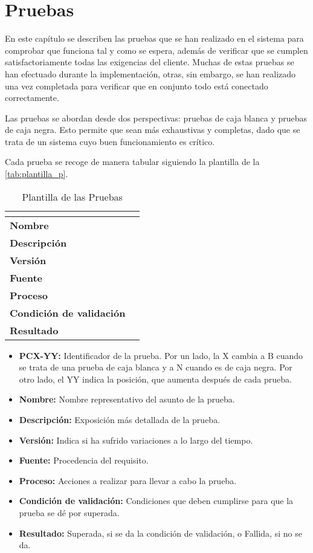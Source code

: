 \chapter{Pruebas}
\label{ch:pruebas}
En este capítulo se describen las pruebas que se han realizado en el sistema para comprobar que funciona tal y como se espera, además de verificar que se cumplen satisfactoriamente todas las exigencias del cliente. Muchas de estas pruebas se han efectuado durante la implementación, otras, sin embargo, se han realizado una vez completada para verificar que en conjunto todo está conectado correctamente.

Las pruebas se abordan desde dos perspectivas: pruebas de caja blanca y pruebas de caja negra. Esto permite que sean más exhaustivas y completas, dado que se trata de un sistema cuyo buen funcionamiento es crítico. 

Cada prueba se recoge de manera tabular siguiendo la plantilla de la \autoref{tab:plantilla_p}.
\begin{table}[H]
	\centering
	\caption{Plantilla de las Pruebas}
	\label{tab:plantilla_p}
	\begin{tabular}{|l|p{}|}
		\hline
		\multicolumn{2}{|c|}{\cellcolor[HTML]{BFBFBF}{\color[HTML]{000000} \textbf{PCX-YY}}} \\ \hline
		\textbf{Nombre}                  &   \\ \hline
		\textbf{Descripción}             &   \\ \hline
		\textbf{Versión}                 &   \\ \hline
		\textbf{Fuente}                  &   \\ \hline
		\textbf{Proceso}                 &   \\ \hline
		\textbf{Condición de validación} &   \\ \hline
		\textbf{Resultado}               &   \\ \hline
	\end{tabular}
\end{table}
\begin{itemize}
	\item \textbf{PCX-YY:} Identificador de la prueba. Por un lado, la X cambia a B cuando se trata de una prueba de caja blanca y a N cuando es de caja negra. Por otro lado, el YY indica la posición, que aumenta después de cada prueba.
	\item \textbf{Nombre:} Nombre representativo del asunto de la prueba.
	\item \textbf{Descripción:} Exposición más detallada de la prueba.
	\item \textbf{Versión:} Indica si ha sufrido variaciones a lo largo del tiempo.
	\item \textbf{Fuente:} Procedencia del requisito.
	\item \textbf{Proceso:} Acciones a realizar para llevar a cabo la prueba.
	\item \textbf{Condición de validación:} Condiciones que deben cumplirse para que la prueba se dé por superada.
	\item \textbf{Resultado:} Superada, si se da la condición de validación, o Fallida, si no se da.
\end{itemize}

